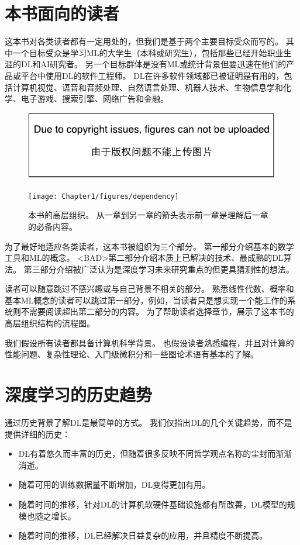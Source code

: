 \section{本书面向的读者}
\label{sec:who_should_read_this_book}

这本书对各类读者都有一定用处的，但我们是基于两个主要目标受众而写的。
其中一个目标受众是学习\gls{ML}的大学生（本科或研究生），包括那些已经开始职业生涯的\gls{DL}和\gls{AI}研究者。
另一个目标群体是没有\gls{ML}或统计背景但要迅速在他们的产品或平台中使用\gls{DL}的软件工程师。
\gls{DL}在许多软件领域都已被证明是有用的，包括计算机视觉、语音和音频处理、自然语言处理、机器人技术、生物信息学和化学、电子游戏、搜索引擎、网络广告和金融。

\begin{figure}[H]
\ifOpenSource
\centerline{\includegraphics{figure.pdf}}
\else
\centerline{\texttt{[image: Chapter1/figures/dependency]}}
\fi
\caption{本书的高层组织。
从一章到另一章的箭头表示前一章是理解后一章的必备内容。}
\label{fig:chap1_dependency}
\end{figure}


为了最好地适应各类读者，这本书被组织为三个部分。
第一部分介绍基本的数学工具和\gls{ML}的概念。
<BAD>第二部分介绍本质上已解决的技术、最成熟的\gls{DL}算法。
第三部分介绍被广泛认为是深度学习未来研究重点的但更具猜测性的想法。

读者可以随意跳过不感兴趣或与自己背景不相关的部分。
熟悉线性代数、概率和基本\gls{ML}概念的读者可以跳过第一部分，例如，当读者只是想实现一个能工作的系统则不需要阅读超出第二部分的内容。
为了帮助读者选择章节，展示了这本书的高层组织结构的流程图。


我们假设所有读者都具备计算机科学背景。
也假设读者熟悉编程，并且对计算的性能问题、复杂性理论、入门级微积分和一些图论术语有基本的了解。
% 
\section{深度学习的历史趋势}
\label{sec:historical_trends_in_deep_learning}
通过历史背景了解\gls{DL}是最简单的方式。
我们仅指出\gls{DL}的几个关键趋势，而不是提供详细的历史：
\begin{itemize}
 \item \gls{DL}有着悠久而丰富的历史，但随着很多反映不同哲学观点名称的尘封而渐渐消逝。
 \item 随着可用的训练数据量不断增加，\gls{DL}变得更加有用。
 \item 随着时间的推移，针对\gls{DL}的计算机软硬件基础设施都有所改善，\gls{DL}模型的规模也随之增长。
 \item 随着时间的推移，\gls{DL}已经解决日益复杂的应用，并且精度不断提高。
\end{itemize}

